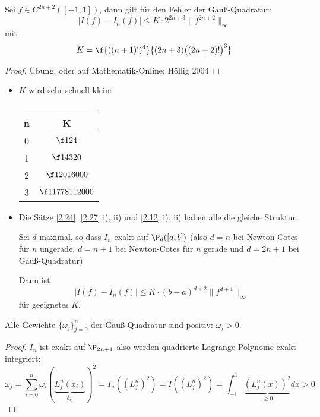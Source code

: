 \documentclass[11pt]{scrbook}
\begin{document}
\begin{st}[Fehlerschranke]
	\label{2.24}
	Sei $f\in C^{2n+2} ([-1,1])$, dann gilt für den Fehler der Gauß-Quadratur:
	\[
		|I(f) - I_n(f)| \le K \cdot 2^{2n+3} \|f^{2n+2}\|_\infty
	\]
	mit
	\[
		K = \f {((n+1)!)^4}{(2n+3)\big((2n+2)!\big)^3}
	\]
	\begin{proof}
		Übung, oder auf Mathematik-Online: Höllig 2004
	\end{proof}
	\begin{note}
		\begin{itemize}
			\item
				$K$ wird sehr schnell klein:
				\begin{table}[H]
					\centering
					\caption{}
					\begin{tabular}{c|c}
					n & K \\ \hline
					0 & $\f 1{24}$ \\
					1 & $\f 1{4320}$ \\
					2 & $\f 1{2016000}$ \\
					3 & $\f 1{1778112000}$ 
					\end{tabular}
				\end{table}
			\item
				Die Sätze \ref{2.24}, \ref{2.27} i), ii) und \ref{2.12} i), ii) haben alle die gleiche Struktur.

				Sei $d$ maximal, so dass $I_n$ exakt auf $\P_d([a,b])$ (also $d=n$ bei Newton-Cotes für $n$ ungerade, $d=n+1$ bei Newton-Cotes für $n$ gerade und $d=2n+1$ bei Gauß-Quadratur)

				Dann ist
				\[
					|I(f) - I_n(f) | \le K \cdot (b-a)^{d+2} \|f^{d+1}\|_\infty
				\]
				für geeignetes $K$.
		\end{itemize}
	\end{note}
\end{st}

\begin{st}[Positivität]
	\label{2.25}	
	Alle Gewichte $\{\omega_j\}_{j=0}^n$ der Gauß-Quadratur sind positiv: $\omega_j > 0$.
	\begin{proof}
		$I_n$ ist exakt auf $\P_{2n+1}$ also werden quadrierte Lagrange-Polynome exakt integriert:
		\[
			\omega_j = \sum_{i=0}^n \omega_i (\underbrace{L_j^n(x_i)}_{\delta_{ij}})^2 = I_n((L_j^n)^2) = I((L_j^n)^2) =\int_{-1}^1 \underbrace{(L_j^n(x))^2}_{\ge 0} dx > 0
		\]
	\end{proof}
\end{st}
\end{document}
